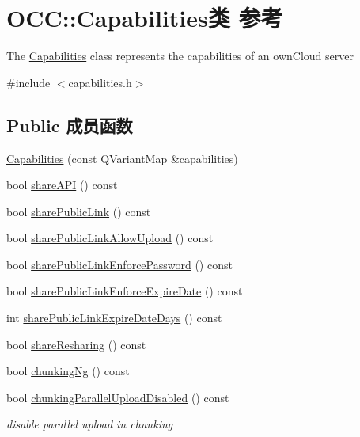 \hypertarget{class_o_c_c_1_1_capabilities}{}\section{O\+CC\+:\+:Capabilities类 参考}
\label{class_o_c_c_1_1_capabilities}


The \hyperlink{class_o_c_c_1_1_capabilities}{Capabilities} class represents the capabilities of an own\+Cloud server  




{\ttfamily \#include $<$capabilities.\+h$>$}

\subsection*{Public 成员函数}
\begin{DoxyCompactItemize}
\item 
\hyperlink{class_o_c_c_1_1_capabilities_abdb4d91106d42ef256c31986cd77de38}{Capabilities} (const Q\+Variant\+Map \&capabilities)
\item 
bool \hyperlink{class_o_c_c_1_1_capabilities_af4d6d69d313737bb9659e99e88141ee8}{share\+A\+PI} () const
\item 
bool \hyperlink{class_o_c_c_1_1_capabilities_a1d994004275deb19b37d3282e1d9f0e0}{share\+Public\+Link} () const
\item 
bool \hyperlink{class_o_c_c_1_1_capabilities_a91319b7715e1fcb446da3d17e203e89e}{share\+Public\+Link\+Allow\+Upload} () const
\item 
bool \hyperlink{class_o_c_c_1_1_capabilities_a93c18b67a270ad8432dd76ad029b52bc}{share\+Public\+Link\+Enforce\+Password} () const
\item 
bool \hyperlink{class_o_c_c_1_1_capabilities_aaf31321b6498c31f113247bb94016f5c}{share\+Public\+Link\+Enforce\+Expire\+Date} () const
\item 
int \hyperlink{class_o_c_c_1_1_capabilities_a594cc3ec8db0711eba361498d303acd1}{share\+Public\+Link\+Expire\+Date\+Days} () const
\item 
bool \hyperlink{class_o_c_c_1_1_capabilities_a9c24d325495db4d44cda0e21fe9bac57}{share\+Resharing} () const
\item 
bool \hyperlink{class_o_c_c_1_1_capabilities_ab01a66d7b904fc6e58db536d1e57dd3b}{chunking\+Ng} () const
\item 
bool \hyperlink{class_o_c_c_1_1_capabilities_a8efe15a086d5f40118cebe2bc12a44e7}{chunking\+Parallel\+Upload\+Disabled} () const
\begin{DoxyCompactList}\small\item\em disable parallel upload in chunking \end{DoxyCompactList}\item 

\end{DoxyCompactItemize}
